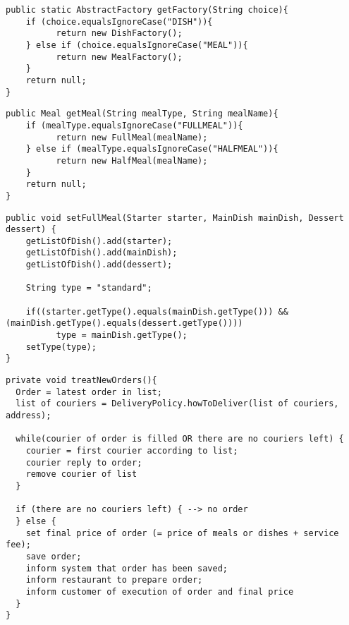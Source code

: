 
\begin{lstlisting}[caption=Factory producer for \texttt{Dish} and \texttt{Meal}.,
label=lst:createFactory]
public static AbstractFactory getFactory(String choice){
    if (choice.equalsIgnoreCase("DISH")){
    	  return new DishFactory();
    } else if (choice.equalsIgnoreCase("MEAL")){
    	  return new MealFactory();
    }
    return null;
}
\end{lstlisting}

\begin{lstlisting}[caption=\emph{MealFactory} to create \texttt{Meal}.,
label=lst:mealCreator]
public Meal getMeal(String mealType, String mealName){
    if (mealType.equalsIgnoreCase("FULLMEAL")){
    	  return new FullMeal(mealName);
    } else if (mealType.equalsIgnoreCase("HALFMEAL")){
    	  return new HalfMeal(mealName);
    } 
    return null;		
}
\end{lstlisting}

\begin{lstlisting}[caption=Set method to add \texttt{Dish} to \texttt{Meal}.,
label=lst:SetFullMeal]
public void setFullMeal(Starter starter, MainDish mainDish, Dessert dessert) {
    getListOfDish().add(starter);
    getListOfDish().add(mainDish);
    getListOfDish().add(dessert);
    
    String type = "standard";
    	
    if((starter.getType().equals(mainDish.getType())) && (mainDish.getType().equals(dessert.getType())))
    	  type = mainDish.getType();
    setType(type);
}
\end{lstlisting}


\begin{lstlisting}[caption=Pseudocode method to treat \texttt{Order} of \texttt{Core}.,
label=lst:treatOrder]
private void treatNewOrders(){ 
  Order = latest order in list;
  list of couriers = DeliveryPolicy.howToDeliver(list of couriers, address);
  	
  while(courier of order is filled OR there are no couriers left) { 
    courier = first courier according to list;
    courier reply to order;
    remove courier of list
  }
  
  if (there are no couriers left) { --> no order 
  } else {
    set final price of order (= price of meals or dishes + service fee);
    save order;
    inform system that order has been saved;
    inform restaurant to prepare order;
    inform customer of execution of order and final price 
  }
}
\end{lstlisting}

